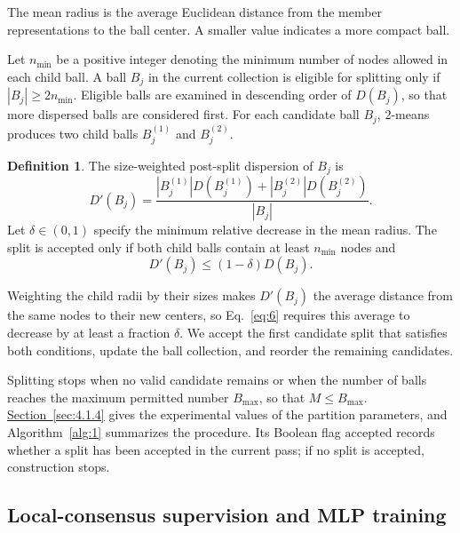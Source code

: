 \documentclass[a4paper,fleqn]{cas-sc}
\theoremstyle{definition}
\newtheorem{definition}{Definition}
\theoremstyle{plain}
\begin{document}
The mean radius is the average Euclidean distance from the member representations to the ball center. A smaller value indicates a more compact ball.


Let \(n_{\min}\) be a positive integer denoting the minimum number of nodes allowed in each child ball. A ball \(B_j\) in the current collection is eligible for splitting only if \(|B_j|\geq 2n_{\min}\). Eligible balls are examined in descending order of \(D(B_j)\), so that more dispersed balls are considered first. For each candidate ball \(B_j\), 2-means produces two child balls \(B_j^{(1)}\) and \(B_j^{(2)}\).

\begin{definition}
The size-weighted post-split dispersion of \(B_j\) is
\begin{equation}\label{eq:5}
D'(B_j) = \frac{|B_j^{(1)}|D(B_j^{(1)}) + |B_j^{(2)}|D(B_j^{(2)})}{|B_j|}.
\end{equation}
Let \(\delta \in (0,1)\) specify the minimum relative decrease in the mean radius. The split is accepted only if both child balls contain at least \(n_{\min}\) nodes and
\begin{equation}\label{eq:6}
D'(B_j) \leq (1 - \delta)D(B_j).
\end{equation}
\end{definition}

Weighting the child radii by their sizes makes \(D'(B_j)\) the average distance from the same nodes to their new centers, so Eq.~\eqref{eq:6} requires this average to decrease by at least a fraction \(\delta\). We accept the first candidate split that satisfies both conditions, update the ball collection, and reorder the remaining candidates.

Splitting stops when no valid candidate remains or when the number of balls reaches the maximum permitted number \(B_{\max}\), so that \(M\leq B_{\max}\). \hyperref[sec:4.1.4]{Section~\ref*{sec:4.1.4}} gives the experimental values of the partition parameters, and Algorithm~\ref{alg:1} summarizes the procedure. Its Boolean flag \(\mathrm{accepted}\) records whether a split has been accepted in the current pass; if no split is accepted, construction stops.



\subsection{Local-consensus supervision and MLP training}\label{sec:3.3}
\end{document}
